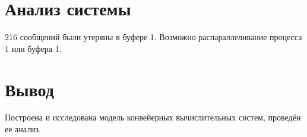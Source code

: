 \documentclass[14pt, a4paper, titlepage]{extarticle}
\begin{document}
	\section{Анализ системы}
	
	216 сообщений были утеряны в буфере 1. Возможно распараллеливание процесса 1 или буфера 1.
	
	\section{Вывод}
	
	Построена и исследована модель конвейерных вычислительных систем, проведён ее анализ.
	
	
	\printbibliography
	
\end{document}
